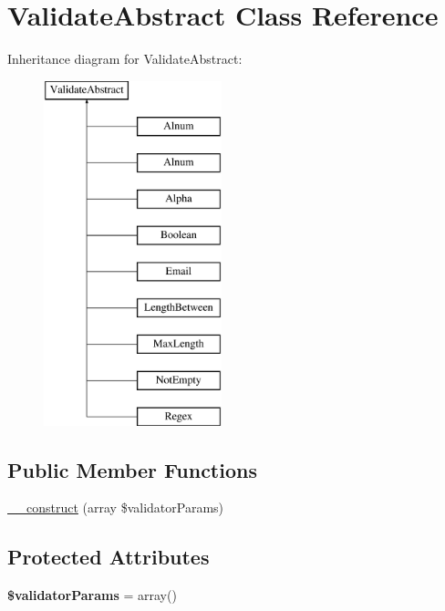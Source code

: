 \hypertarget{class_anemo_1_1_validate_1_1_adapter_1_1_validate_abstract}{
\section{ValidateAbstract Class Reference}
\label{class_anemo_1_1_validate_1_1_adapter_1_1_validate_abstract}
}
Inheritance diagram for ValidateAbstract:\begin{figure}[H]
\begin{center}
\leavevmode
\includegraphics[height=10.000000cm]{class_anemo_1_1_validate_1_1_adapter_1_1_validate_abstract}
\end{center}
\end{figure}
\subsection*{Public Member Functions}
\begin{DoxyCompactItemize}
\item 
\hyperlink{class_anemo_1_1_validate_1_1_adapter_1_1_validate_abstract_a014712440874b9611912c6731f4998eb}{\_\-\_\-construct} (array \$validatorParams)
\end{DoxyCompactItemize}
\subsection*{Protected Attributes}
\begin{DoxyCompactItemize}
\item 
\hypertarget{class_anemo_1_1_validate_1_1_adapter_1_1_validate_abstract_a82faa35a2958a73c42559d77c5c77c82}{
{\bfseries \$validatorParams} = array()}
\label{class_anemo_1_1_validate_1_1_adapter_1_1_validate_abstract_a82faa35a2958a73c42559d77c5c77c82}

\end{DoxyCompactItemize}


